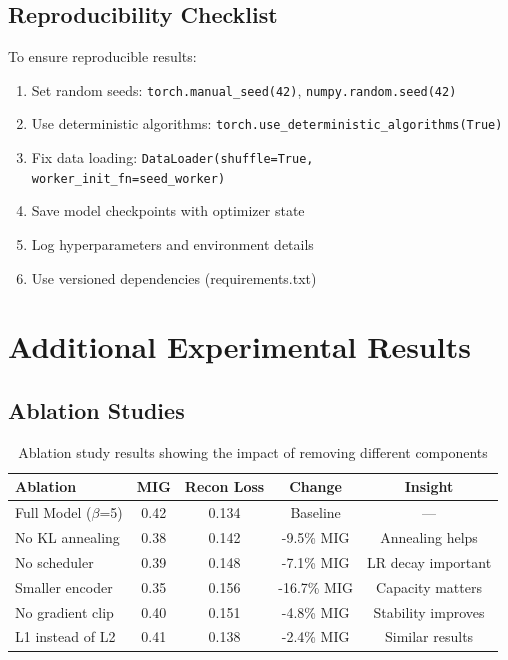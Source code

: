 \documentclass[conference]{IEEEtran}
\begin{document}
\subsection{Reproducibility Checklist}

To ensure reproducible results:
\begin{enumerate}
    \item Set random seeds: \texttt{torch.manual\_seed(42)}, \texttt{numpy.random.seed(42)}
    \item Use deterministic algorithms: \texttt{torch.use\_deterministic\_algorithms(True)}
    \item Fix data loading: \texttt{DataLoader(shuffle=True, worker\_init\_fn=seed\_worker)}
    \item Save model checkpoints with optimizer state
    \item Log hyperparameters and environment details
    \item Use versioned dependencies (requirements.txt)
\end{enumerate}

\section{Additional Experimental Results}

\subsection{Ablation Studies}

\begin{table}[H]
\centering
\begin{tabular}{@{}lcccc@{}}
\toprule
\textbf{Ablation} & \textbf{MIG} & \textbf{Recon Loss} & \textbf{Change} & \textbf{Insight} \\ \midrule
Full Model ($\beta$=5) & 0.42 & 0.134 & Baseline & --- \\
No KL annealing & 0.38 & 0.142 & -9.5\% MIG & Annealing helps \\
No scheduler & 0.39 & 0.148 & -7.1\% MIG & LR decay important \\
Smaller encoder & 0.35 & 0.156 & -16.7\% MIG & Capacity matters \\
No gradient clip & 0.40 & 0.151 & -4.8\% MIG & Stability improves \\
L1 instead of L2 & 0.41 & 0.138 & -2.4\% MIG & Similar results \\ \bottomrule
\end{tabular}
\caption{Ablation study results showing the impact of removing different components}
\label{tab:ablation}
\end{table}
\end{document}
